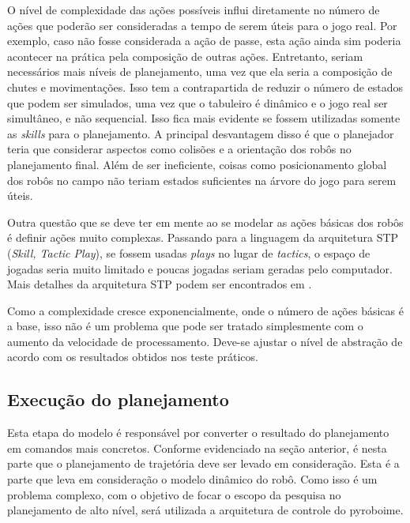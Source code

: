 O nível de complexidade das ações possíveis influi diretamente no número de
ações que poderão ser consideradas a tempo de serem úteis para o jogo real. Por
exemplo, caso não fosse considerada a ação de passe, esta ação ainda sim poderia
acontecer na prática pela composição de outras ações. Entretanto, seriam
necessários mais níveis de planejamento, uma vez que ela seria a composição de
chutes e movimentações. Isso tem a contrapartida de reduzir o número de estados
que podem ser simulados, uma vez que o tabuleiro é dinâmico e o jogo real ser
simultâneo, e não sequencial. Isso fica mais evidente se fossem utilizadas
somente as \textit{skills} para o planejamento. A principal desvantagem disso
é que o planejador teria que considerar aspectos como colisões e a orientação
dos robôs no planejamento final. Além de ser ineficiente, coisas como
posicionamento global dos robôs no campo não teriam estados suficientes na
árvore do jogo para serem úteis.

Outra questão que se deve ter em mente ao se modelar as ações básicas dos robôs
é definir ações muito complexas. Passando para a linguagem da arquitetura STP
(\textit{Skill, Tactic Play}), se fossem usadas \textit{plays} no lugar de
\textit{tactics}, o espaço de jogadas seria muito limitado e poucas jogadas
seriam geradas pelo computador. Mais detalhes da arquitetura STP podem ser
encontrados em \cite{browning2004stp}.

Como a complexidade cresce exponencialmente, onde o número de ações básicas é
a base, isso não é um problema que pode ser tratado simplesmente com o aumento
da velocidade de processamento. Deve-se ajustar o nível de abstração de acordo
com os resultados obtidos nos teste práticos.

\subsection{Execução do planejamento}

Esta etapa do modelo é responsável por converter o resultado do planejamento em
comandos mais concretos. Conforme evidenciado na seção anterior, é nesta parte
que o planejamento de trajetória deve ser levado em consideração. Esta é a parte que
leva em consideração o modelo dinâmico do robô.
Como isso é um problema complexo, com o objetivo de focar o escopo da pesquisa
no planejamento de alto nível, será utilizada a arquitetura de controle do
pyroboime. %


